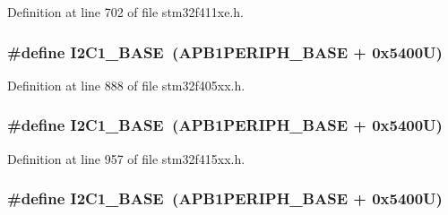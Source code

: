 Definition at line 702 of file stm32f411xe.\+h.

\subsubsection[{\texorpdfstring{I2\+C1\+\_\+\+B\+A\+SE}{I2C1_BASE}}]{\setlength{\rightskip}{0pt plus 5cm}\#define I2\+C1\+\_\+\+B\+A\+SE~({\bf A\+P\+B1\+P\+E\+R\+I\+P\+H\+\_\+\+B\+A\+SE} + 0x5400\+U)}\hypertarget{group___peripheral__registers__structures_gacd72dbffb1738ca87c838545c4eb85a3}{}\label{group___peripheral__registers__structures_gacd72dbffb1738ca87c838545c4eb85a3}


Definition at line 888 of file stm32f405xx.\+h.

\subsubsection[{\texorpdfstring{I2\+C1\+\_\+\+B\+A\+SE}{I2C1_BASE}}]{\setlength{\rightskip}{0pt plus 5cm}\#define I2\+C1\+\_\+\+B\+A\+SE~({\bf A\+P\+B1\+P\+E\+R\+I\+P\+H\+\_\+\+B\+A\+SE} + 0x5400\+U)}\hypertarget{group___peripheral__registers__structures_gacd72dbffb1738ca87c838545c4eb85a3}{}\label{group___peripheral__registers__structures_gacd72dbffb1738ca87c838545c4eb85a3}


Definition at line 957 of file stm32f415xx.\+h.

\subsubsection[{\texorpdfstring{I2\+C1\+\_\+\+B\+A\+SE}{I2C1_BASE}}]{\setlength{\rightskip}{0pt plus 5cm}\#define I2\+C1\+\_\+\+B\+A\+SE~({\bf A\+P\+B1\+P\+E\+R\+I\+P\+H\+\_\+\+B\+A\+SE} + 0x5400\+U)}\hypertarget{group___peripheral__registers__structures_gacd72dbffb1738ca87c838545c4eb85a3}{}\label{group___peripheral__registers__structures_gacd72dbffb1738ca87c838545c4eb85a3}



